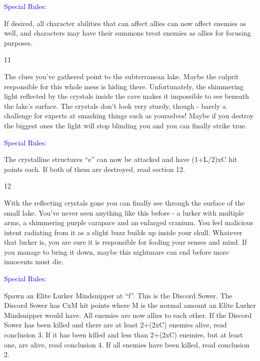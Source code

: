 \documentclass[fontsize=11pt]{scrartcl}
\begin{document}
\begin{multicols}{3}
		\begin{center}
	    {\myfont\normalsize{\textcolor{Blue}{Special Rules:}}}
		\end{center}
		\footnotesize{If desired, all character abilities that can affect allies can now affect enemies as well, and characters may have their summons treat enemies as allies for focusing purposes.}
		\begin{center}
		  {\myfont\large{\textcolor{Sepia}{11}}}
		\end{center}
		\footnotesize{The clues you’ve gathered point to the subterranean lake. Maybe the culprit responsible for this whole mess is hiding there. Unfortunately, the shimmering light reflected by the crystals inside the cave makes it impossible to see beneath the lake’s surface. The crystals don’t look very sturdy, though - barely a challenge for experts at smashing things such as yourselves! Maybe if you destroy the biggest ones the light will stop blinding you and you can finally strike true.}
		\begin{center}
	    {\myfont\normalsize{\textcolor{Blue}{Special Rules:}}}
		\end{center}
		\footnotesize{The crystalline structures “e” can now be attacked and have (1+L/2)xC hit points each. If both of them are destroyed, read section 12.}
		\begin{center}
		  {\myfont\large{\textcolor{Sepia}{12}}}
		\end{center}
		\footnotesize{With the reflecting crystals gone you can finally see through the surface of the small lake. You’ve never seen anything like this before - a lurker with multiple arms, a shimmering purple carapace and an enlarged cranium. You feel malicious intent radiating from it as a slight buzz builds up inside your skull. Whatever that lurker is, you are sure it is responsible for fooling your senses and mind. If you manage to bring it down, maybe this nightmare can end before more innocents must die.}
		\begin{center}
	    {\myfont\normalsize{\textcolor{Blue}{Special Rules:}}}
		\end{center}
		\footnotesize{Spawn an Elite Lurker Mindsnipper at “f”. This is the Discord Sower. The Discord Sower has CxM hit points where M is the normal amount an Elite Lurker Mindsnipper would have. All enemies are now allies to each other. If the Discord Sower has been killed and there are at least 2+(2xC) enemies alive, read conclusion 3. If it has been killed and less than 2+(2xC) enemies, but at least one, are alive, read conclusion 4. If all enemies have been killed, read conclusion 2. }
		\end{multicols}
\end{document}
